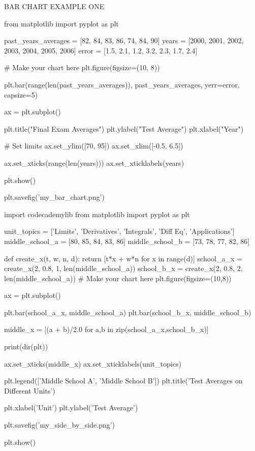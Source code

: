 \documentclass{journal}
\begin{document}
BAR CHART EXAMPLE ONE

from matplotlib import pyplot as plt

past_years_averages = [82, 84, 83, 86, 74, 84, 90]
years = [2000, 2001, 2002, 2003, 2004, 2005, 2006]
error = [1.5, 2.1, 1.2, 3.2, 2.3, 1.7, 2.4]

# Make your chart here
plt.figure(figsize=(10, 8))

plt.bar(range(len(past_years_averages)), past_years_averages, yerr=error, capsize=5)

ax = plt.subplot()

plt.title("Final Exam Averages")
plt.ylabel("Test Average")
plt.xlabel("Year")

# Set limits
ax.set_ylim([70, 95])
ax.set_xlim([-0.5, 6.5])

ax.set_xticks(range(len(years)))
ax.set_xticklabels(years)

plt.show()

plt.savefig('my_bar_chart.png')









import codecademylib
from matplotlib import pyplot as plt

unit_topics = ['Limits', 'Derivatives', 'Integrals', 'Diff Eq', 'Applications']
middle_school_a = [80, 85, 84, 83, 86]
middle_school_b = [73, 78, 77, 82, 86]

def create_x(t, w, n, d):
    return [t*x + w*n for x in range(d)]
school_a_x = create_x(2, 0.8, 1, len(middle_school_a))
school_b_x = create_x(2, 0.8, 2, len(middle_school_a))
# Make your chart here
plt.figure(figsize=(10,8))

ax = plt.subplot()

plt.bar(school_a_x, middle_school_a)
plt.bar(school_b_x, middle_school_b)

middle_x = [(a + b)/2.0 for a,b in zip(school_a_x,school_b_x)]

print(dir(plt))

ax.set_xticks(middle_x)
ax.set_xticklabels(unit_topics)

plt.legend(['Middle School A', 'Middle School B'])
plt.title('Test Averages on Different Units')

plt.xlabel('Unit')
plt.ylabel('Test Average')

plt.savefig('my_side_by_side.png')



plt.show()
\end{document}
